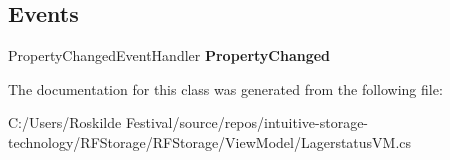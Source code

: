 \subsection*{Events}
\begin{DoxyCompactItemize}
\item 
\mbox{\label{class_r_f_storage_1_1_view_model_1_1_lagerstatus_v_m_a7871a80d7ccacb6c91c8ad9af5152b8c}} 
Property\+Changed\+Event\+Handler {\bfseries Property\+Changed}
\end{DoxyCompactItemize}


The documentation for this class was generated from the following file\+:\begin{DoxyCompactItemize}
\item 
C\+:/\+Users/\+Roskilde Festival/source/repos/intuitive-\/storage-\/technology/\+R\+F\+Storage/\+R\+F\+Storage/\+View\+Model/Lagerstatus\+V\+M.\+cs\end{DoxyCompactItemize}
